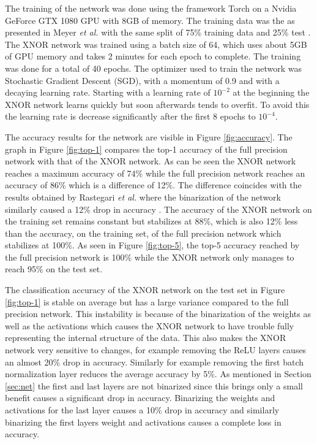 \documentclass[conference]{IEEEtran}
\begin{document}
The training of the network was done using the framework Torch on a Nvidia GeForce GTX 1080 GPU with 8GB of memory. The training data was the as presented in Meyer \textit{et al.} with the same split of 75\% training data and 25\% test \cite{lukas}. The XNOR network was trained using a batch size of 64, which uses about 5GB of GPU memory and takes 2 minutes for each epoch to complete. The training was done for a total of 40 epochs. The optimizer used to train the network was Stochastic Gradient Descent (SGD), with a momentum of 0.9 and with a decaying learning rate. Starting with a learning rate of $10^{-2}$ at the beginning the XNOR network learns quickly but soon afterwards tends to overfit. To avoid this the learning rate is decrease significantly after the first 8 epochs to $10^{-4}$.

The accuracy results for the network are visible in Figure \ref{fig:accuracy}. The graph in Figure \ref{fig:top-1} compares the top-1 accuracy of the full precision network with that of the XNOR network. As can be seen the XNOR network reaches a maximum accuracy of 74\% while the full precision network reaches an accuracy of 86\% which is a difference of 12\%. The difference coincides with the results obtained by Rastegari \textit{et al.} where the binarization of the network similarly caused a 12\% drop in accuracy \cite{xnor}. The accuracy of the XNOR network on the training set remains constant but stabilizes at 88\%, which is also 12\% less than the accuracy, on the training set, of the full precision network which stabilizes at 100\%. As seen in Figure \ref{fig:top-5}, the top-5 accuracy reached by the full precision network is 100\% while the XNOR network only manages to reach 95\% on the test set.

The classification accuracy of the XNOR network on the test set in Figure \ref{fig:top-1} is stable on average but has a large variance compared to the full precision network. This instability is because of the binarization of the weights as well as the activations which causes the XNOR network to have trouble fully representing the internal structure of the data. This also makes the XNOR network very sensitive to changes, for example removing the ReLU layers causes an almost 20\% drop in accuracy. Similarly for example removing the first batch normalization layer reduces the average accuracy by 5\%. As mentioned in Section \ref{sec:net} the first and last layers are not binarized since this brings only a small benefit causes a significant drop in accuracy. Binarizing the weights and activations for the last layer causes a 10\% drop in accuracy and similarly binarizing the first layers weight and activations causes a complete loss in accuracy.
\end{document}
